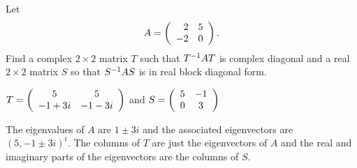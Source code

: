 \documentclass{ximera}
\begin{document}
\begin{exercise}  \label{c10.4.4}
Let 
\[
A=\left(\begin{array}{rr} 2 & 5\\ -2 &0\end{array}\right).
\]
Find a complex $2\times 2$ matrix $T$ such that $T^{-1} AT$ is complex
diagonal and a real $2\times 2$ matrix $S$ so that $S^{-1} AS$ is in real
block diagonal form.

\begin{solution}

\ans $T = \left(\begin{array}{cc} 5 & 5\\ -1+3i &-1-3i\end{array}\right)$ and $S=\left(\begin{array}{cc} 5 & -1\\ 0 &3\end{array}\right)$ 

\soln The eigenvalues of $A$ are $1\pm 3i$ and the associated eigenvectors 
are $(5,-1\pm 3i)^t$.  The columns of $T$ are just the eigenvectors of $A$
and the real and imaginary parts of the eigenvectors are the columns of $S$. 


\end{solution}
\end{exercise}
\end{document}

